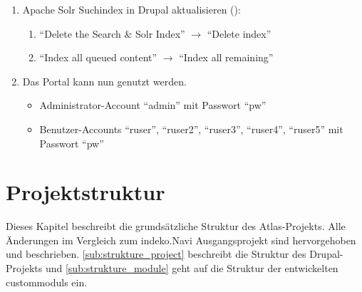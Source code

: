 \begin{enumerate}
	\item Apache Solr Suchindex in Drupal aktualisieren ():
	\begin{enumerate}
		\item \enquote{Delete the Search \& Solr Index} $\rightarrow$ \enquote{Delete index}

		\item \enquote{Index all queued content}  $\rightarrow$ \enquote{Index all remaining}
	\end{enumerate}

	\item Das Portal kann nun genutzt werden.
	\begin{itemize}
		\item Administrator-Account \enquote{admin} mit Passwort \enquote{pw}
		\item Benutzer-Accounts \enquote{ruser}, \enquote{ruser2}, \enquote{ruser3}, \enquote{ruser4}, \enquote{ruser5}  mit Passwort \enquote{pw}
	\end{itemize}
\end{enumerate}



\section{Projektstruktur}
Dieses Kapitel beschreibt die grundsätzliche Struktur des Atlas-Projekts. Alle Änderungen im Vergleich zum \acrshort{indeko}.Navi Ausgangsprojekt sind hervorgehoben und beschrieben. \cref{sub:strukture_project} beschreibt die Struktur des Drupal-Projekts und \cref{sub:strukture_module} geht auf die Struktur der entwickelten \glspl{custommodul} ein.



